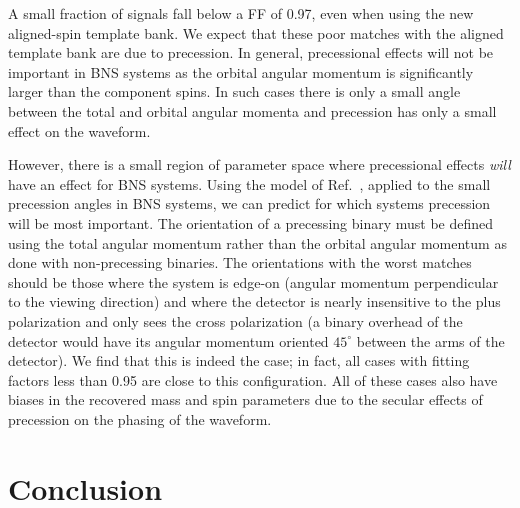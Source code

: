 A small fraction of signals fall below a FF of 0.97, even when using the new aligned-spin template bank.
We expect that these poor matches with the aligned template bank are
due to precession. In general, precessional effects will not be important in BNS systems
as the orbital angular momentum is significantly larger than the component spins.
In such cases there is only a small angle between the total and orbital angular momenta
and precession has only a small effect on the waveform.

However, there is a small region of parameter space where precessional effects \textit{will}
have an effect for BNS systems.
Using the model of Ref.~\cite{Brown:2012gs}, applied to the small precession angles in BNS systems, 
we can predict for which systems precession will be most important.
The orientation of a precessing binary must be defined using the total angular momentum rather than the 
orbital angular momentum as done with non-precessing binaries. 
The orientations with the worst matches should be those where the system is edge-on 
(angular momentum perpendicular to the viewing direction) and where the detector is nearly insensitive 
to the plus polarization and only sees the cross polarization (a binary overhead of the detector would have 
its angular momentum oriented $45^{\circ}$ between the arms of the detector).
We find that
this is indeed the case; in fact, all cases with fitting factors less than 0.95 are close to
this configuration. All of these cases also have biases in the recovered mass and
spin parameters due to the secular effects of precession on the phasing of the waveform.

\section{Conclusion}
\label{sec:conclusion}

